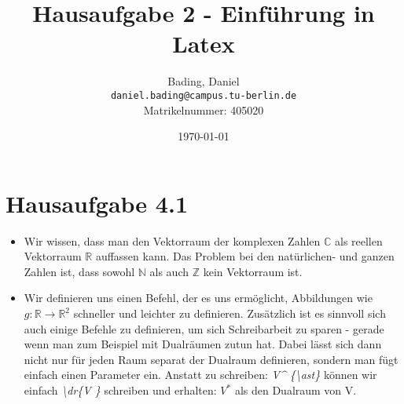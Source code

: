 \documentclass[11pt,a4paper]{scrartcl} %
\title{Hausaufgabe 2 - Einführung in Latex}
\author{
  Bading, Daniel\\
  \texttt{daniel.bading@campus.tu-berlin.de}\\
  Matrikelnummer: 405020
  }
\date{\today}
\newcommand{\R}{\mathbb{R}}
\newcommand{\N}{\mathbb{N}}
\newcommand{\Z}{\mathbb{Z}}
\newcommand{\C}{\mathbb{C}}
\newcommand{\deff}[3]{#1 : #2 \to #3}
\newcommand{\dr}[1]{#1^{\ast}}
\begin{document}
\maketitle

\newpage

\tableofcontents

\newpage


\section{Hausaufgabe 4.1}

\begin{itemize}
\item Wir wissen, dass man den Vektorraum der komplexen Zahlen $\C$ als reellen Vektorraum $\R$ auffassen kann. Das Problem bei den natürlichen- und ganzen Zahlen ist, dass sowohl $\N$ als auch $\Z$ kein Vektorraum ist. 
\item Wir definieren uns einen Befehl, der es uns ermöglicht, Abbildungen wie $\deff{g}{\R}{\R^2}$ schneller und leichter zu definieren. Zusätzlich ist es sinnvoll sich auch einige Befehle zu definieren, um sich Schreibarbeit zu sparen - gerade wenn man zum Beispiel mit Dualräumen zutun hat. Dabei lässt sich dann nicht nur für jeden Raum separat der Dualraum definieren, sondern man fügt einfach einen Parameter ein. Anstatt zu schreiben: \textit{V\^{} \{\textbackslash ast\}} 
können wir einfach \textit{\textbackslash dr\{V \}} schreiben und erhalten: $\dr{V}$ als den Dualraum von V. 
\end{itemize}

\newpage
\end{document}
